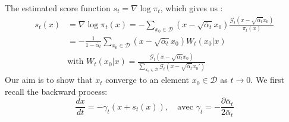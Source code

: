 \documentclass[a4paper,10pt]{article}
\theoremstyle{definition} %
\theoremstyle{definition} %
\theoremstyle{definition} %
\theoremstyle{definition} %
\newcommand{\0}{\boldsymbol{0}}
\begin{document}
The estimated score function $s_t = \nabla \log \pi_t$, which gives us 
:\begin{align*}
s_t(x) &= \nabla \log \pi_t(x) = -\sum\limits_{x_0  \in \mathcal{D}} (x - \sqrt{\bar \alpha_t}x_0) \frac{\mathcal{G}_t(x - \sqrt{\bar \alpha_t}x_0)}{\pi_t(x)} \\
&= -\frac{1}{1-\bar \alpha_t} \sum\limits_{x_0  \in \mathcal{D}} (x - \sqrt{\bar \alpha_t}x_0) W_t(x_0 | x) \\
& \text{with }W_t(x_0| x) = \frac{\mathcal{G}_t(x - \sqrt{ \bar \alpha_t}x_0)}{\sum\limits_{x_0  \in \mathcal{D}} \mathcal{G}_t(x - \sqrt{\bar \alpha_t}x_0')}
\end{align*}
Our aim is to show that $x_t$ converge to an element $x_0 \in \mathcal{D}$ as $t \rightarrow 0$. We first recall the backward process:
\begin{equation*}
    \frac{dx}{dt} =  -\gamma_t(x+s_t(x)), \quad \text{avec } \gamma_t = -\frac{\partial \bar \alpha_t}{2\bar \alpha_t} 
\end{equation*}
\end{document}
